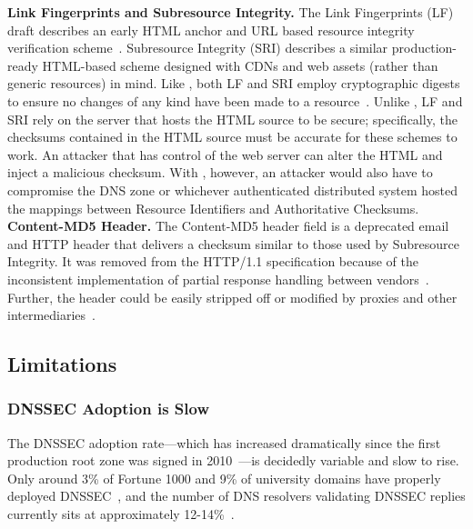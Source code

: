 \noindent\textbf{Link Fingerprints and Subresource Integrity.} The Link
Fingerprints (LF) draft describes an early HTML anchor and URL based resource
integrity verification scheme~\cite{LF}. Subresource Integrity (SRI) describes a
similar production-ready HTML-based scheme designed with CDNs and web assets
(rather than generic resources) in mind. Like \SYSTEM{}, both LF and SRI employ
cryptographic digests to ensure no changes of any kind have been made to a
resource~\cite{SRI}. Unlike \SYSTEM{}, LF and SRI rely on the server that hosts
the HTML source to be secure; specifically, the checksums contained in the HTML
source must be accurate for these schemes to work. An attacker that has control
of the web server can alter the HTML and inject a malicious checksum. With
\SYSTEM{}, however, an attacker would also have to compromise the DNS zone or
whichever authenticated distributed system hosted the mappings between Resource
Identifiers and Authoritative Checksums. \\

\noindent\textbf{Content-MD5 Header.} The Content-MD5 header field is a
deprecated email and HTTP header that delivers a checksum similar to those used
by Subresource Integrity. It was removed from the HTTP/1.1 specification because
of the inconsistent implementation of partial response handling between
vendors~\cite{HTTP1.1}. Further, the header could be easily stripped off or
modified by proxies and other intermediaries~\cite{MD5Header}.

\subsection{Limitations}

\subsubsection{DNSSEC Adoption is Slow}

The DNSSEC adoption rate---which has increased dramatically since the first
production root zone was signed in 2010~\cite{Cloudflare, APNIC}---is decidedly
variable and slow to rise. Only around 3\% of Fortune 1000 and 9\% of university
domains have properly deployed DNSSEC~\cite{NIST-IPv6}, and the number of DNS
resolvers validating DNSSEC replies currently sits at approximately
12-14\%~\cite{APNIC}.


